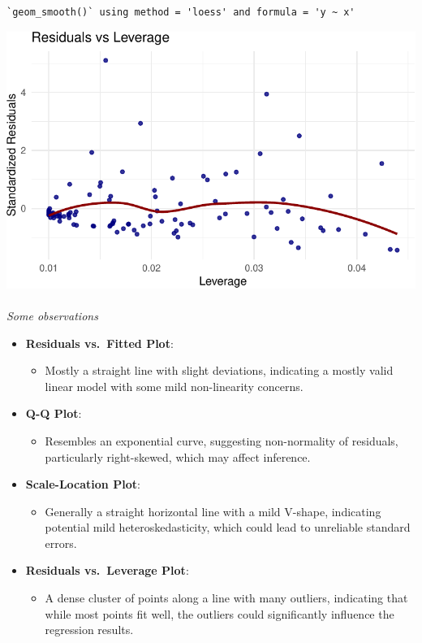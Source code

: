 \documentclass[
  11pt,
]{article}
\makeatletter
\let\oldparagraph\paragraph
\renewcommand{\paragraph}{
    \@ifstar
      \xxxParagraphStar
      \xxxParagraphNoStar
  }
\newcommand{\xxxParagraphStar}[1]{\oldparagraph*{#1}\mbox{}}
\newcommand{\xxxParagraphNoStar}[1]{\oldparagraph{#1}\mbox{}}
\providecommand{\tightlist}{%
  \setlength{\itemsep}{0pt}\setlength{\parskip}{0pt}}\usepackage{longtable,booktabs,array}
\makeatother
\begin{document}
\begin{verbatim}
`geom_smooth()` using method = 'loess' and formula = 'y ~ x'
\end{verbatim}

\includegraphics{HW-4-CODE-and-ANSWERS_files/figure-pdf/unnamed-chunk-4-1.pdf}

\paragraph{\texorpdfstring{\emph{Some
observations}}{Some observations}}\label{some-observations}

\begin{itemize}
\item
  \textbf{Residuals vs.~Fitted Plot}:

  \begin{itemize}
  \tightlist
  \item
    Mostly a straight line with slight deviations, indicating a mostly
    valid linear model with some mild non-linearity concerns.
  \end{itemize}
\item
  \textbf{Q-Q Plot}:

  \begin{itemize}
  \tightlist
  \item
    Resembles an exponential curve, suggesting non-normality of
    residuals, particularly right-skewed, which may affect inference.
  \end{itemize}
\item
  \textbf{Scale-Location Plot}:

  \begin{itemize}
  \tightlist
  \item
    Generally a straight horizontal line with a mild V-shape, indicating
    potential mild heteroskedasticity, which could lead to unreliable
    standard errors.
  \end{itemize}
\item
  \textbf{Residuals vs.~Leverage Plot}:

  \begin{itemize}
  \tightlist
  \item
    A dense cluster of points along a line with many outliers,
    indicating that while most points fit well, the outliers could
    significantly influence the regression results.
  \end{itemize}
\end{itemize}
\end{document}
